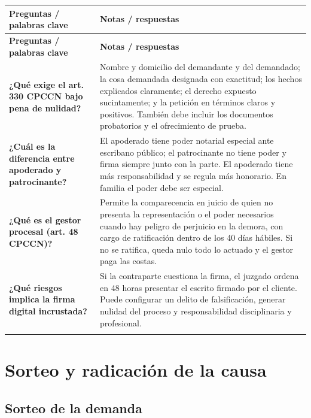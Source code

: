 \documentclass[12pt,oneside]{book}
\makeatletter
\newenvironment{cornell}{%
  \par\smallskip
  \begin{longtable}{@{}>{\raggedright\arraybackslash}p{0.28\textwidth}
                    >{\raggedright\arraybackslash}p{0.66\textwidth}@{}}
  \toprule
  \textbf{Preguntas / palabras clave} & \textbf{Notas / respuestas} \\
  \midrule
  \endfirsthead
  \toprule
  \textbf{Preguntas / palabras clave} & \textbf{Notas / respuestas} \\
  \midrule
  \endhead
}{%
  \bottomrule
  \end{longtable}
}
\newcommand{\cornellresumen}[1]{%
  \midrule
  \multicolumn{2}{@{}p{0.96\textwidth}@{}}{\textbf{Resumen:} #1} \\
}
\makeatother
\begin{document}
\begin{cornell}
\textbf{¿Qué exige el art. 330 CPCCN bajo pena de nulidad?} &
Nombre y domicilio del demandante y del demandado; la cosa demandada designada con exactitud; los hechos explicados claramente; el derecho expuesto sucintamente; y la petición en términos claros y positivos. También debe incluir los documentos probatorios y el ofrecimiento de prueba. \\[0.6em]

\textbf{¿Cuál es la diferencia entre apoderado y patrocinante?} &
El apoderado tiene poder notarial especial ante escribano público; el patrocinante no tiene poder y firma siempre junto con la parte. El apoderado tiene más responsabilidad y se regula más honorario. En familia el poder debe ser especial. \\[0.6em]

\textbf{¿Qué es el gestor procesal (art. 48 CPCCN)?} &
Permite la comparecencia en juicio de quien no presenta la representación o el poder necesarios cuando hay peligro de perjuicio en la demora, con cargo de ratificación dentro de los 40 días hábiles. Si no se ratifica, queda nulo todo lo actuado y el gestor paga las costas. \\[0.6em]

\textbf{¿Qué riesgos implica la firma digital incrustada?} &
Si la contraparte cuestiona la firma, el juzgado ordena en 48 horas presentar el escrito firmado por el cliente. Puede configurar un delito de falsificación, generar nulidad del proceso y responsabilidad disciplinaria y profesional. \\
\cornellresumen{La demanda debe cumplir el art. 330 CPCCN bajo pena de nulidad. El abogado la firma como apoderado (con poder especial) o como patrocinante (junto con la parte). El gestor procesal (art. 48) permite actuar ante un vencimiento con ratificación en 40 días hábiles. Las firmas deben ser auténticas y, en el consultorio, presenciales, para evitar nulidades y responsabilidades.}
\end{cornell}

\chapter{Sorteo y radicación de la causa}

\section{Sorteo de la demanda}
\end{document}
